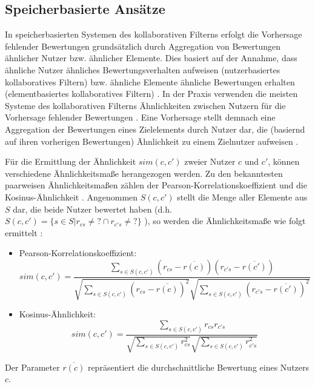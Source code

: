 \subsection{Speicherbasierte Ansätze}
In speicherbasierten Systemen des kollaborativen Filterns erfolgt die Vorhersage fehlender Bewertungen grundsätzlich durch Aggregation \cite[S.738]{adomavicius:inproceedings} von Bewertungen ähnlicher Nutzer bzw. ähnlicher Elemente.
Dies basiert auf der Annahme, dass ähnliche Nutzer ähnliches Bewertungsverhalten aufweisen (nutzerbasiertes kollaboratives Filtern) bzw. ähnliche Elemente ähnliche Bewertungen erhalten (elementbasiertes kollaboratives Filtern) \cite[S. 29]{recommenderSystems:2016}.
In der Praxis verwenden die meisten Systeme des kollaborativen Filterns Ähnlichkeiten zwischen Nutzern für die Vorhersage fehlender Bewertungen \cite[S. 427]{recommenderSystems:2016}.
Eine Vorhersage stellt demnach eine Aggregation der Bewertungen eines Zielelements durch Nutzer dar, die (basiernd auf ihren vorherigen Bewertungen) Ähnlichkeit zu einem Zielnutzer aufweisen \cite[S.738]{adomavicius:inproceedings}.

Für die Ermittlung der Ähnlichkeit $sim(c,c')$ zweier Nutzer $c$ und $c'$, können verschiedene Ähnlichkeitsmaße herangezogen werden.
Zu den bekanntesten paarweisen Ähnlichkeitsmaßen zählen der Pearson-Korrelationskoeffizient und die Kosinus-Ähnlichkeit \cite[S. 856]{adomavicius:4:inbook}\cite[S. 738]{adomavicius:inproceedings}.
Angenommen $S(c,c')$ stellt die Menge aller Elemente aus $S$ dar, die beide Nutzer bewertet haben (d.h. $S(c,c')=\{s \in S | r_{cs} \neq ? \cap r_{c's} \neq ?\}$ \cite[S. 738]{adomavicius:inproceedings}), so werden die Ähnlichkeitsmaße wie folgt ermittelt \cite[S. 856]{adomavicius:4:inbook}:
\begin{itemize}
    \item Pearson-Korrelationskoeffizient:
    \begin{equation}\label{eq13}
        sim(c,c') = \frac{\sum\limits_{s \in S(c,c')}(r_{cs}-\overline{r(c)})(r_{c's}-\overline{r(c')})}{\sqrt{\sum\limits_{s \in S(c,c')}(r_{cs}-\overline{r(c)})^{2}}\sqrt{\sum\limits_{s \in S(c,c')}(r_{c's}-\overline{r(c')})^{2}}}
    \end{equation}
    \item Kosinus-Ähnlichkeit:
    \begin{equation}\label{eq14}
        sim(c,c') = \frac{\sum\limits_{s \in S(c,c')}r_{cs}r_{c's}}{\sqrt{\sum\limits_{s \in S(c,c')}r_{cs}^{2}}\sqrt{\sum\limits_{s \in S(c,c')}r_{c's}^{2}}}
    \end{equation}
\end{itemize}
Der Parameter $\overline{r(c)}$ repräsentiert die durchschnittliche Bewertung eines Nutzers $c$.

